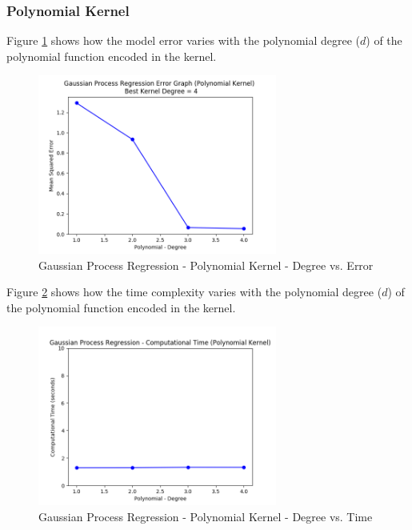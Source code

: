\documentclass[parskip=full]{scrartcl}
\begin{document}

        \subsubsection*{Polynomial Kernel} %
        \label{ssub:polynomial_kernel}

            Figure \ref{fig:gpr_polynomial_degree_vs_error} shows how the model error varies with the polynomial degree ($d$) of the polynomial function encoded in the kernel.

            \begin{figure}
                \centering
                \includegraphics[width=0.7\textwidth]{3c_gpr_polynomial_degree_vs_error.png}
                \caption{Gaussian Process Regression - Polynomial Kernel - Degree vs. Error}
                \label{fig:gpr_polynomial_degree_vs_error}
            \end{figure}

            Figure \ref{fig:gpr_polynomial_degree_vs_time} shows how the time complexity varies with the polynomial degree ($d$) of the polynomial function encoded in the kernel.

            \begin{figure}
                \centering
                \includegraphics[width=0.7\textwidth]{3c_gpr_polynomial_degree_vs_time.png}
                \caption{Gaussian Process Regression - Polynomial Kernel - Degree vs. Time}
                \label{fig:gpr_polynomial_degree_vs_time}
            \end{figure}
        
\end{document}
